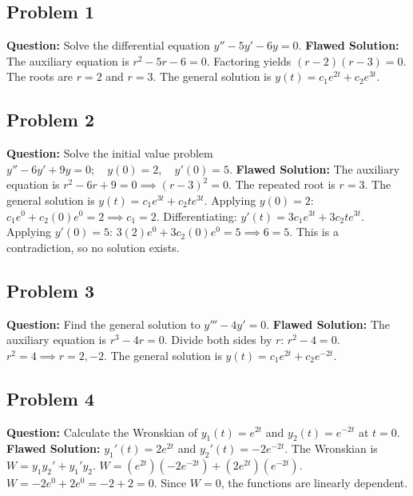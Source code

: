 \documentclass[12pt]{article}
\begin{document}
\subsection{Problem 1}
\textbf{Question:} Solve the differential equation $y'' - 5y' - 6y = 0$.
\textbf{Flawed Solution:}
The auxiliary equation is $r^2 - 5r - 6 = 0$.
Factoring yields $(r - 2)(r - 3) = 0$.
The roots are $r = 2$ and $r = 3$.
The general solution is $y(t) = c_1 e^{2t} + c_2 e^{3t}$.

\subsection{Problem 2}
\textbf{Question:} Solve the initial value problem $y'' - 6y' + 9y = 0; \quad y(0)=2, \quad y'(0)=5$.
\textbf{Flawed Solution:}
The auxiliary equation is $r^2 - 6r + 9 = 0 \implies (r-3)^2 = 0$.
The repeated root is $r=3$.
The general solution is $y(t) = c_1 e^{3t} + c_2 t e^{3t}$.
Applying $y(0)=2$: $c_1 e^0 + c_2(0)e^0 = 2 \implies c_1 = 2$.
Differentiating: $y'(t) = 3c_1 e^{3t} + 3c_2 t e^{3t}$.
Applying $y'(0)=5$: $3(2)e^0 + 3c_2(0)e^0 = 5 \implies 6 = 5$.
This is a contradiction, so no solution exists.

\subsection{Problem 3}
\textbf{Question:} Find the general solution to $y''' - 4y' = 0$.
\textbf{Flawed Solution:}
The auxiliary equation is $r^3 - 4r = 0$.
Divide both sides by $r$: $r^2 - 4 = 0$.
$r^2 = 4 \implies r = 2, -2$.
The general solution is $y(t) = c_1 e^{2t} + c_2 e^{-2t}$.

\subsection{Problem 4}
\textbf{Question:} Calculate the Wronskian of $y_1(t) = e^{2t}$ and $y_2(t) = e^{-2t}$ at $t=0$.
\textbf{Flawed Solution:}
$y_1'(t) = 2e^{2t}$ and $y_2'(t) = -2e^{-2t}$.
The Wronskian is $W = y_1 y_2' + y_1' y_2$.
$W = (e^{2t})(-2e^{-2t}) + (2e^{2t})(e^{-2t})$.
$W = -2e^0 + 2e^0 = -2 + 2 = 0$.
Since $W=0$, the functions are linearly dependent.
\end{document}
